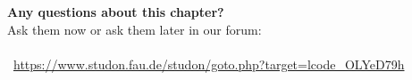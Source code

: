 \begin{frame}[c]
	\begin{center}
		{\bf Any questions about this chapter?}\\[0.5cm]
		Ask them now or ask them later in our forum: \\\bigskip
		 \\
		\vspace*{0.5cm}
		\faLink\ \url{https://www.studon.fau.de/studon/goto.php?target=lcode_OLYeD79h} \smallskip

	\end{center}
\end{frame}
